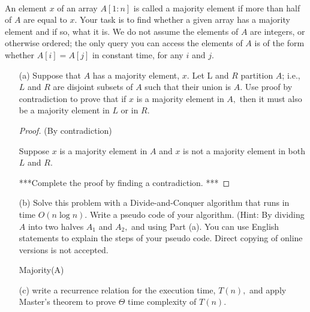\documentclass[12pt]{article}
\newcommand{\vs}{\vspace{2mm}}
\begin{document}
\vs\






An element $x$ of an array $A[1 : n]$ is called a majority element if more than half of $A$ are equal to $x$. Your task is to find whether a given array has a majority element and if so, what it is. We do not assume the elements of $A$ are integers, or otherwise ordered; the only query you can access the elements of $A$ is of the form whether $A[i] = A[j]$ in constant time, for any $i$ and $j$.  

\begin{itemize}
\item[(a)]	Suppose that $A$ has a majority element, $x$. Let L and $R$ partition $A$; i.e., $L$ and $R$ are disjoint subsets of $A$ such that their union is $A.$ Use proof by contradiction to prove that if $x$ is a majority element in $A,$ then it must also be a majority element in $L$ or in $R.$

\begin{proof} (By contradiction)

Suppose $x$ is a majority element in $A$ and $x$ is not a majority element in both $L$ and $R$. 

***Complete the proof by finding a contradiction. ***
    
\end{proof}


\item[(b)]	Solve this problem with a Divide-and-Conquer algorithm that runs in time $O(n \log n). $ Write a pseudo code of your algorithm.   (Hint: By dividing $A$ into two halves $A_1$ and $A_2,$ and using Part (a). You can use English statements to explain the steps of your pseudo code. Direct copying of online versions is not accepted.


\begin{algorithm}
\caption{Majority(A)}
\begin{algorithmic}[1]
\end{algorithmic}
\end{algorithm}

\item[(c)]write a recurrence relation for the execution time, $T(n),$ and apply Master's theorem to prove $\Theta$ time complexity of $T(n)$.


\end{itemize}
\end{document}
